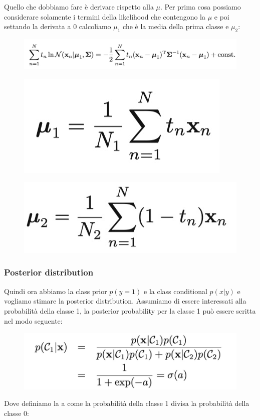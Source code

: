 \documentclass[14pt]{extreport}
\begin{document}
Quello che dobbiamo fare è derivare rispetto alla $\mu$. Per prima cosa possiamo considerare solamente i termini della likelihood che contengono la
$\mu$ e poi settando la derivata a 0 calcoliamo $\mu_1$ che è la media della prima classe e $\mu_2$:

\begin{figure}[H]
	\centering
	\includegraphics[width=0.8\linewidth]{207.jpeg}
\end{figure}

\begin{figure}[H]
	\centering
	\includegraphics[width=0.3\linewidth]{208.jpeg}
\end{figure}

\begin{figure}[H]
	\centering
	\includegraphics[width=0.3\linewidth]{209.jpeg}
\end{figure}

\subsubsection{Posterior distribution}

Quindi ora abbiamo la class prior $p(y=1)$ e la class conditional $p(x|y)$ e vogliamo stimare la posterior distribution. Assumiamo di essere
interessati alla probabilità della classe 1, la posterior probability per la classe 1 può essere scritta nel modo seguente:

\begin{figure}[H]
	\centering
	\includegraphics[width=0.6\linewidth]{165.jpeg}
\end{figure}

Dove definiamo la a come la probabilità della classe 1 divisa la probabilità della classe 0:
\end{document}
